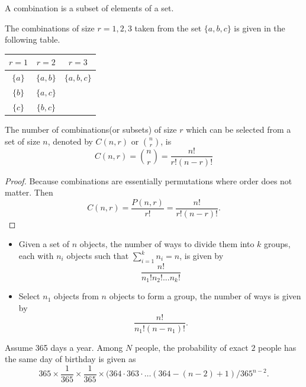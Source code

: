 \begin{refsection}
\begin{definition}[combination]
A combination is a subset of elements of a set.	
\end{definition}


\begin{example}
The combinations of size $r=1,2,3$ taken from the set $\{a,b,c\}$ is given in the following table.

\begin{center}
	\begin{tabular}{|c|c|c|}
		\hline
		$r=1$   & $r=2$     & $r=3$       \\ \hline
		$\{a\}$ & $\{a,b\}$ & $\{a,b,c\}$ \\ \hline
		$\{b\}$ & $\{a,c\}$ &             \\ \hline
		$\{c\}$ & $\{b,c\}$ &             \\ \hline
	\end{tabular}
\end{center}	
\end{example}


\begin{theorem}
The number of combinations(or subsets) of size $r$ which can be selected from a set of size $n$, denoted by $C(n,r)$ or $\binom{n}{r}$, is 
$$C(n,r) = \binom{n}{r} = \frac{n!}{r!(n-r)!}$$
\end{theorem}
\begin{proof}
Because combinations are essentially permutations where order does not matter. Then 
$$C(n,r) = \frac{P(n,r)}{r!} = \frac{n!}{r!(n-r)!}.$$
\end{proof}




\begin{lemma}\hfill
	\begin{itemize}
		\item Given a set of $n$ objects, the number of ways to divide them into $k$ groups, each with $n_i$ objects such that $\sum_{i=1}^k n_i = n$, is given by
		$$\frac{n!}{n_1!n_2!...n_k!}$$
		\item Select $n_1$ objects from $n$ objects to form a group, the number of ways is given by
		$$\frac{n!}{n_1!(n-n_1)!}.$$ 
	\end{itemize}
\end{lemma}


\begin{example}
	Assume 365 days a year. Among $N$ people, the probability of exact $2$ people has the same day of birthday is given as
	$$365\times \frac{1}{365}\times \frac{1}{365}\times ( 364 \cdot 363\cdot \dots (364-(n-2)+1)/365^{n-2}.$$
\end{example}


\end{refsection}
